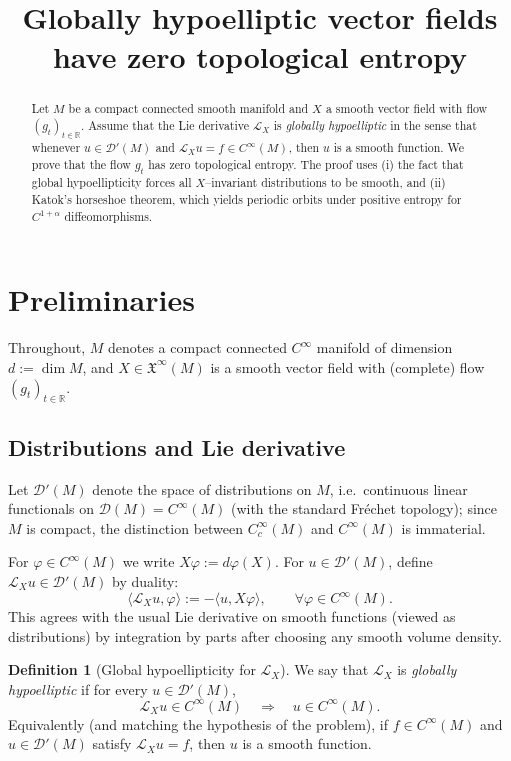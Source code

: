 \documentclass[11pt]{article}
\theoremstyle{definition}
\newtheorem{definition}{Definition}
\theoremstyle{remark}
\newcommand{\D}{\mathcal{D}}
\newcommand{\Dist}{\mathcal{D}'}
\newcommand{\Lie}{\mathcal{L}}
\begin{document}
\title{Globally hypoelliptic vector fields have zero topological entropy}
\author{}
\date{}
\maketitle

\begin{abstract}
Let $M$ be a compact connected smooth manifold and $X$ a smooth vector field with flow $(g_t)_{t\in\mathbb{R}}$.
Assume that the Lie derivative $\Lie_X$ is \emph{globally hypoelliptic} in the sense that whenever $u\in\Dist(M)$ and
$\Lie_X u=f\in C^\infty(M)$, then $u$ is a smooth function. We prove that the flow $g_t$ has zero topological entropy.
The proof uses (i) the fact that global hypoellipticity forces all $X$--invariant distributions to be smooth,
and (ii) Katok's horseshoe theorem, which yields periodic orbits under positive entropy for $C^{1+\alpha}$ diffeomorphisms.
\end{abstract}

\section{Preliminaries}

Throughout, $M$ denotes a compact connected $C^\infty$ manifold of dimension $d:=\dim M$, and
$X\in \mathfrak{X}^\infty(M)$ is a smooth vector field with (complete) flow $(g_t)_{t\in\mathbb{R}}$.

\subsection{Distributions and Lie derivative}

Let $\Dist(M)$ denote the space of distributions on $M$, i.e.\ continuous linear functionals on $\D(M)=C^\infty(M)$
(with the standard Fr\'echet topology); since $M$ is compact, the distinction between $C_c^\infty(M)$ and $C^\infty(M)$ is immaterial.

For $\varphi\in C^\infty(M)$ we write $X\varphi:=d\varphi(X)$.
For $u\in\Dist(M)$, define $\Lie_X u\in\Dist(M)$ by duality:
\begin{equation}\label{eq:LieDist}
  \langle \Lie_X u,\varphi\rangle := - \langle u, X\varphi\rangle,\qquad \forall \varphi\in C^\infty(M).
\end{equation}
This agrees with the usual Lie derivative on smooth functions (viewed as distributions) by integration by parts
after choosing any smooth volume density.

\begin{definition}[Global hypoellipticity for $\Lie_X$]\label{def:GH}
We say that $\Lie_X$ is \emph{globally hypoelliptic} if for every $u\in \Dist(M)$,
\[
\Lie_X u\in C^\infty(M)\quad \Longrightarrow\quad u\in C^\infty(M).
\]
Equivalently (and matching the hypothesis of the problem), if $f\in C^\infty(M)$ and $u\in\Dist(M)$ satisfy
$\Lie_X u=f$, then $u$ is a smooth function.
\end{definition}
\end{document}
